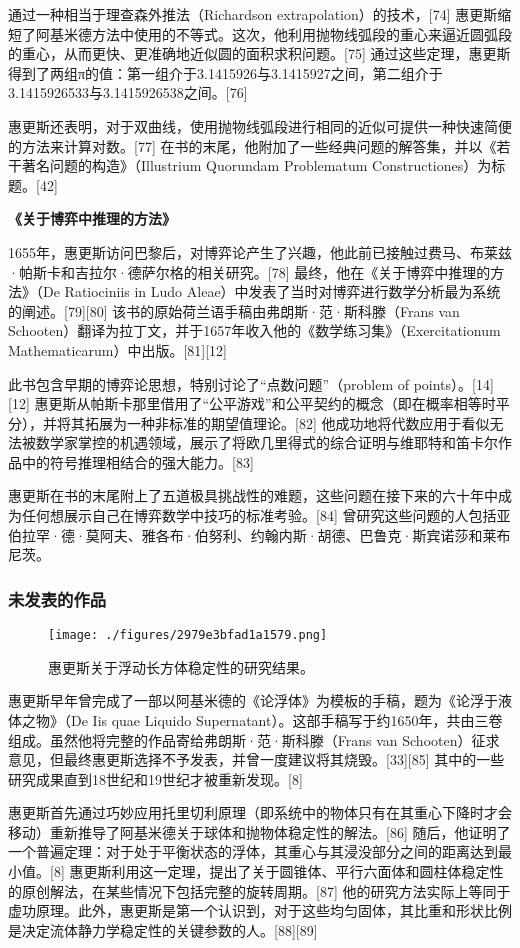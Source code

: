 通过一种相当于理查森外推法（Richardson extrapolation）的技术，[74] 惠更斯缩短了阿基米德方法中使用的不等式。这次，他利用抛物线弧段的重心来逼近圆弧段的重心，从而更快、更准确地近似圆的面积求积问题。[75] 通过这些定理，惠更斯得到了两组π的值：第一组介于3.1415926与3.1415927之间，第二组介于3.1415926533与3.1415926538之间。[76]

惠更斯还表明，对于双曲线，使用抛物线弧段进行相同的近似可提供一种快速简便的方法来计算对数。[77] 在书的末尾，他附加了一些经典问题的解答集，并以《若干著名问题的构造》（Illustrium Quorundam Problematum Constructiones）为标题。[42]

\textbf{《关于博弈中推理的方法》}

1655年，惠更斯访问巴黎后，对博弈论产生了兴趣，他此前已接触过费马、布莱兹·帕斯卡和吉拉尔·德萨尔格的相关研究。[78] 最终，他在《关于博弈中推理的方法》（De Ratiociniis in Ludo Aleae）中发表了当时对博弈进行数学分析最为系统的阐述。[79][80] 该书的原始荷兰语手稿由弗朗斯·范·斯科滕（Frans van Schooten）翻译为拉丁文，并于1657年收入他的《数学练习集》（Exercitationum Mathematicarum）中出版。[81][12]

此书包含早期的博弈论思想，特别讨论了“点数问题”（problem of points）。[14][12] 惠更斯从帕斯卡那里借用了“公平游戏”和公平契约的概念（即在概率相等时平分），并将其拓展为一种非标准的期望值理论。[82] 他成功地将代数应用于看似无法被数学家掌控的机遇领域，展示了将欧几里得式的综合证明与维耶特和笛卡尔作品中的符号推理相结合的强大能力。[83]

惠更斯在书的末尾附上了五道极具挑战性的难题，这些问题在接下来的六十年中成为任何想展示自己在博弈数学中技巧的标准考验。[84] 曾研究这些问题的人包括亚伯拉罕·德·莫阿夫、雅各布·伯努利、约翰内斯·胡德、巴鲁克·斯宾诺莎和莱布尼茨。
\subsubsection{未发表的作品}
\begin{figure}[ht]
\centering
\texttt{[image: ./figures/2979e3bfad1a1579.png]}
\caption{惠更斯关于浮动长方体稳定性的研究结果。} \label{fig_HGS_8}
\end{figure}
惠更斯早年曾完成了一部以阿基米德的《论浮体》为模板的手稿，题为《论浮于液体之物》（De Iis quae Liquido Supernatant）。这部手稿写于约1650年，共由三卷组成。虽然他将完整的作品寄给弗朗斯·范·斯科滕（Frans van Schooten）征求意见，但最终惠更斯选择不予发表，并曾一度建议将其烧毁。[33][85] 其中的一些研究成果直到18世纪和19世纪才被重新发现。[8]

惠更斯首先通过巧妙应用托里切利原理（即系统中的物体只有在其重心下降时才会移动）重新推导了阿基米德关于球体和抛物体稳定性的解法。[86] 随后，他证明了一个普遍定理：对于处于平衡状态的浮体，其重心与其浸没部分之间的距离达到最小值。[8] 惠更斯利用这一定理，提出了关于圆锥体、平行六面体和圆柱体稳定性的原创解法，在某些情况下包括完整的旋转周期。[87] 他的研究方法实际上等同于虚功原理。此外，惠更斯是第一个认识到，对于这些均匀固体，其比重和形状比例是决定流体静力学稳定性的关键参数的人。[88][89]
